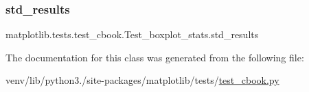 \subsubsection{\texorpdfstring{std\+\_\+results}{std\_results}}
{\footnotesize\ttfamily matplotlib.\+tests.\+test\+\_\+cbook.\+Test\+\_\+boxplot\+\_\+stats.\+std\+\_\+results}



The documentation for this class was generated from the following file\+:\begin{DoxyCompactItemize}
\item 
venv/lib/python3./site-\/packages/matplotlib/tests/\hyperlink{test__cbook_8py}{test\+\_\+cbook.\+py}\end{DoxyCompactItemize}
